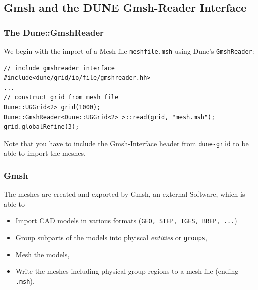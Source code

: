 \subsection{Gmsh and the DUNE Gmsh-Reader Interface}

\begin{frame}[fragile]
  \frametitle{The Dune::GmshReader}
  We begin with the import of a Mesh file \lstinline!meshfile.msh! using Dune's
  \lstinline!GmshReader!:
  \begin{lstlisting}[basicstyle=\scriptsize]
// include gmshreader interface
#include<dune/grid/io/file/gmshreader.hh>
...
// construct grid from mesh file
Dune::UGGrid<2> grid(1000);
Dune::GmshReader<Dune::UGGrid<2> >::read(grid, "mesh.msh");
grid.globalRefine(3);
  \end{lstlisting}
  Note that you have to include the Gmsh-Interface header from
  \lstinline!dune-grid! to be able to import the meshes.
\end{frame}

\begin{frame}[fragile]
  \frametitle{Gmsh}
  The meshes are created and exported by Gmsh, an external Software,
  which is able to
  \begin{itemize}
    \item Import CAD models in various formats (\lstinline!GEO, STEP, IGES, BREP, ...!)
    \item Group subparts of the models into phyiscal \emph{entities} or
      \lstinline{groups},
    \item Mesh the models,
    \item Write the meshes including physical group regions to a mesh file
      (ending \lstinline!.msh!).
  \end{itemize}
\end{frame}

